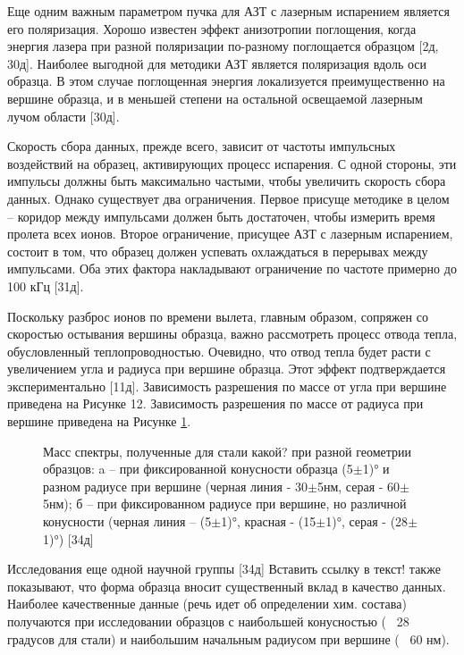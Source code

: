Еще одним важным параметром пучка для АЗТ с лазерным испарением является его поляризация. Хорошо известен эффект анизотропии поглощения, когда энергия лазера при разной поляризации по-разному поглощается образцом [2д, 30д]. Наиболее выгодной для методики АЗТ является поляризация вдоль оси образца. В этом случае поглощенная энергия локализуется преимущественно на вершине образца, и в меньшей степени на остальной освещаемой лазерным лучом области [30д].

Скорость сбора данных, прежде всего, зависит от частоты импульсных воздействий на образец, активирующих процесс испарения. С одной стороны, эти импульсы должны быть максимально частыми, чтобы увеличить скорость сбора данных. Однако существует два ограничения. Первое присуще методике в целом – коридор между импульсами должен быть достаточен, чтобы измерить время пролета всех ионов. Второе ограничение, присущее АЗТ с лазерным испарением, состоит в том, что образец должен успевать охлаждаться в перерывах между импульсами. Оба этих фактора накладывают ограничение по частоте примерно до 100 кГц [31д].

Поскольку разброс ионов по времени вылета, главным образом, сопряжен со скоростью остывания вершины образца, важно рассмотреть процесс отвода тепла, обусловленный теплопроводностью. Очевидно, что отвод тепла будет расти с увеличением угла и радиуса при вершине образца. Этот эффект подтверждается экспериментально [11д]. Зависимость разрешения по массе от угла при вершине приведена на Рисунке 12. Зависимость разрешения по массе от радиуса при вершине приведена на Рисунке \cref{fig:ParamsGeometry}.

\begin{figure}[htb]
	\caption{Масс спектры, полученные для стали какой? при разной геометрии образцов: a – при фиксированной конусности образца (5$\pm$1)° и разном радиусе при вершине (черная линия - 30$\pm$5нм, серая - 60$\pm$5нм); б – при фиксированном радиусе при вершине, но различной конусности (черная линия – (5$\pm$1)°, красная - (15$\pm$1)°, серая - (28$\pm$1)°) [34д] }
	\label{fig:ParamsGeometry}
\end{figure}

Исследования еще одной научной группы [34д] Вставить ссылку в текст! также показывают, что форма образца вносит существенный вклад в качество данных. Наиболее качественные данные (речь идет об определении хим. состава) получаются при исследовании образцов с наибольшей конусностью (~ 28 градусов для стали) и наибольшим начальным радиусом при вершине (~ 60 нм).

